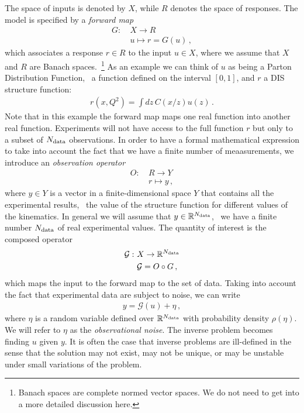 The space of inputs is denoted by $X$, while $R$ denotes the space of responses.
The model is specified by a {\em forward map}
\begin{align}
  \label{eq:ForwardMap}
  G : ~& X \to R \nonumber \\
      & u \mapsto r=G(u) \, ,
\end{align}
which associates a response $r \in R$ to the input $u \in X$, where we assume
that $X$ and $R$ are Banach spaces.~\footnote{Banach spaces are complete normed
vector spaces. We do not need to get into a more detailed discussion here.} As
an example we can think of $u$ as being a Parton Distribution Function, \ie\ a
function defined on the interval $[0,1]$, and $r$ a DIS structure function:
\begin{align}
  \label{eq:DISExample}
  r(x,Q^2) = \int dz\, C(x/z) u(z)\, .
\end{align}
Note that in this example the forward map maps one real function into
another real function. Experiments will not have access to the full
function $r$ but only to a subset of $N_{\rm data}$ observations. In order
to have a formal mathematical expression to take into account the fact
that we have a finite number of meaasurements, we introduce an {\em
  observation operator}
\begin{align}
  O : ~& R \to Y \nonumber \\
       & r \mapsto y \, ,
\end{align}
where $y \in Y$ is a vector in a finite-dimensional space $Y$ that contains all
the experimental results, \eg\ the value of the structure function for different
values of the kinematics. In general we will assume that $y \in
\mathbb{R}^{N_{\rm data}}$, \ie\ we have a finite number $N_{\rm data}$ of real experimental
values. The quantity of interest is the composed operator
\begin{align}
  \mathcal{G} : ~& X \to \mathbb{R}^{N_{\rm data}} \nonumber \\
                 & \mathcal{G} = O \circ G\, ,
\end{align}
which maps the input to the forward map to the set of data. Taking
into account the fact that experimental data are subject to noise, we
can write
\begin{align}
  \label{eq:NoisyInverseProblem}
  y = \mathcal{G}(u) + \eta\, ,
\end{align}
where $\eta$ is a random variable defined over $\mathbb{R}^{N_{\rm data}}$
with probability density $\rho(\eta)$. We will refer to $\eta$ as the
{\em observational noise}. The inverse problem becomes finding $u$
given $y$. It is often the case that inverse problems are ill-defined
in the sense that the solution may not exist, may not be unique, or
may be unstable under small variations of the problem. 

